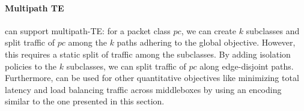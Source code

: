 \paragraph{Multipath TE}
\name can support multipath-TE: for a packet class $pc$, we can create $k$ 
subclasses and split traffic of $pc$ among the $k$ paths adhering to 
the global objective. However, this 
requires a static split of traffic among the subclasses. By adding isolation
policies to the $k$ subclasses, we can split traffic 
of $pc$ along edge-disjoint paths. Furthermore, \name can be used for other
quantitative objectives like minimizing total latency and load balancing
traffic across middleboxes by using an encoding similar 
to the one presented in this section.

